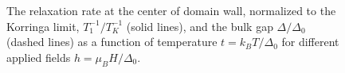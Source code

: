 \documentclass[prb,aps,showpacs,amsmath,twocolumn,10pt]{revtex4-1}
\newcommand{\blue}{\textcolor{blue}}
\newcommand{\red}{\textcolor{red}}
\begin{document}
\begin{figure}
\hfill
{}
\caption{
The relaxation rate at the center of domain wall, 
normalized to the Korringa limit, $T_1^{-1} / T_K^{-1}$ (solid lines), 
and the bulk gap $\Delta/\Delta_0$ (dashed lines) as a function of temperature $t = k_B T/\Delta_0$ 
for different applied fields $h = \mu_B H/\Delta_0$. 
}
\end{figure}
\end{document}
